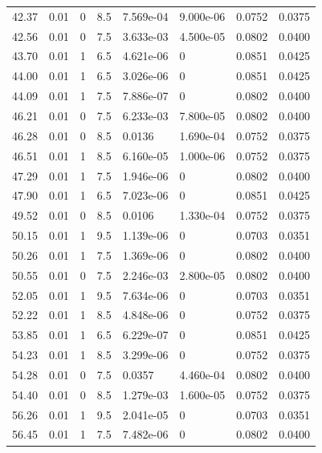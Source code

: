 \documentclass[preview]{standalone}
\begin{document}
{{{\begin{tabular}{L{1.2cm}C{1.2cm} C{0.3cm}C{0.5cm} C{1.4cm}C{1.4cm} C{1.4cm}C{1.4cm}}
  42.37  &  0.01  & 0     & 8.5 &  7.569e-04  & 9.000e-06  & 0.0752 &  0.0375   \\ 
  42.56  &  0.01  & 0     & 7.5 &  3.633e-03  & 4.500e-05  & 0.0802 &  0.0400   \\ 
  43.70  &  0.01  & 1     & 6.5 &  4.621e-06  & 0  & 0.0851 &  0.0425   \\ 
  44.00  &  0.01  & 1     & 6.5 &  3.026e-06  & 0  & 0.0851 &  0.0425   \\ 
  44.09  &  0.01  & 1     & 7.5 &  7.886e-07  & 0  & 0.0802 &  0.0400   \\ 
  46.21  &  0.01  & 0     & 7.5 &  6.233e-03  & 7.800e-05  & 0.0802 &  0.0400   \\ 
  46.28  &  0.01  & 0     & 8.5 &  0.0136  & 1.690e-04  & 0.0752 &  0.0375   \\ 
  46.51  &  0.01  & 1     & 8.5 &  6.160e-05  & 1.000e-06  & 0.0752 &  0.0375   \\ 
  47.29  &  0.01  & 1     & 7.5 &  1.946e-06  & 0  & 0.0802 &  0.0400   \\ 
  47.90  &  0.01  & 1     & 6.5 &  7.023e-06  & 0  & 0.0851 &  0.0425   \\ 
  49.52  &  0.01  & 0     & 8.5 &  0.0106  & 1.330e-04  & 0.0752 &  0.0375   \\ 
  50.15  &  0.01  & 1     & 9.5 &  1.139e-06  & 0  & 0.0703 &  0.0351   \\ 
  50.26  &  0.01  & 1     & 7.5 &  1.369e-06  & 0  & 0.0802 &  0.0400   \\ 
  50.55  &  0.01  & 0     & 7.5 &  2.246e-03  & 2.800e-05  & 0.0802 &  0.0400   \\ 
  52.05  &  0.01  & 1     & 9.5 &  7.634e-06  & 0  & 0.0703 &  0.0351   \\ 
  52.22  &  0.01  & 1     & 8.5 &  4.848e-06  & 0  & 0.0752 &  0.0375   \\ 
  53.85  &  0.01  & 1     & 6.5 &  6.229e-07  & 0  & 0.0851 &  0.0425   \\ 
  54.23  &  0.01  & 1     & 8.5 &  3.299e-06  & 0  & 0.0752 &  0.0375   \\ 
  54.28  &  0.01  & 0     & 7.5 &  0.0357  & 4.460e-04  & 0.0802 &  0.0400   \\ 
  54.40  &  0.01  & 0     & 8.5 &  1.279e-03  & 1.600e-05  & 0.0752 &  0.0375   \\ 
  56.26  &  0.01  & 1     & 9.5 &  2.041e-05  & 0  & 0.0703 &  0.0351   \\ 
  56.45  &  0.01  & 1     & 7.5 &  7.482e-06  & 0  & 0.0802 &  0.0400   \\ 

\end{tabular}}}}
\end{document}
